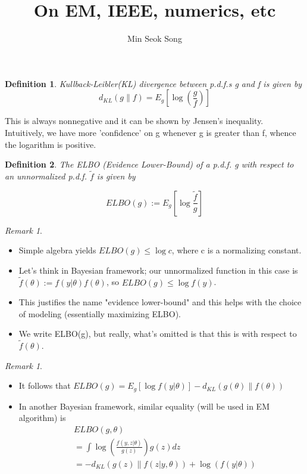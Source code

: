 \documentclass{article}
\title{On EM, IEEE, numerics, etc}
\author{Min Seok Song}
\date{}
\newtheorem{definition}{Definition}
\theoremstyle{remark}
\newtheorem{remark}[example]{Remark}
\begin{document}
\maketitle
\begin{definition}
Kullback-Leibler(KL) divergence between p.d.f.s g and f is given by
 $$d_{KL}(g\|f)=E_g[\log(\frac gf)]$$
\end{definition}
This is always nonnegative and it can be shown by Jensen's inequality. Intuitively, 
we have more 'confidence' on g whenever g is greater than f, whence the logarithm is positive.
\begin{definition}
The ELBO (Evidence Lower-Bound) of a p.d.f. g with respect to an unnormalized p.d.f. $\tilde{f}$ is given by

$$ELBO(g):=E_g[\log \frac{\tilde{f}}{g}]$$
\end{definition}
\begin{remark}
\begin{itemize}
\item Simple algebra yields $ELBO(g)\leq \log c$, where c is a normalizing constant.
\item Let's think in Bayesian framework; our unnormalized function in this case is
 $\tilde{f}(\theta):=f(y\vert \theta)f(\theta)$, so $ELBO(g)\leq\log f(y)$.
\item This justifies the name "evidence lower-bound" and this helps with the choice of modeling (essentially maximizing ELBO).
\item We write ELBO(g), but really, what's omitted is that this is with respect to $\tilde f(\theta)$.
\end{itemize}
\end{remark}
\begin{remark}
    \begin{itemize}
\item It follows that $ELBO(g)=E_g[\log f(y\rvert \theta)]-d_{KL}(g(\theta)\| f(\theta))$\\
\item In another Bayesian framework, similar equality (will be used in EM algorithm) is
\begin{align*}
        & ELBO(g,\theta)\\
        & =\int \log(\frac{f(y,z\vert\theta)}{g(z)})g(z)dz\\
        & =-d_{KL}(g(z)\| f(z\vert y,\theta))+\log(f(y\vert\theta))
\end{align*}
\end{itemize}
\end{remark}
\end{document}
